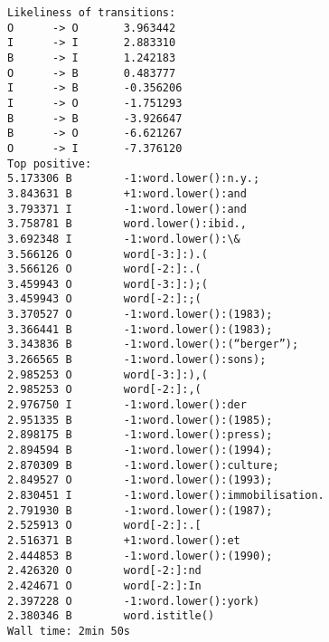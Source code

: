 \documentclass[11pt]{article}
\begin{document}
\begin{Verbatim}[commandchars=\\\{\}]
Likeliness of transitions:
O      -> O       3.963442
I      -> I       2.883310
B      -> I       1.242183
O      -> B       0.483777
I      -> B       -0.356206
I      -> O       -1.751293
B      -> B       -3.926647
B      -> O       -6.621267
O      -> I       -7.376120
Top positive:
5.173306 B        -1:word.lower():n.y.;
3.843631 B        +1:word.lower():and
3.793371 I        -1:word.lower():and
3.758781 B        word.lower():ibid.,
3.692348 I        -1:word.lower():\&
3.566126 O        word[-3:]:).(
3.566126 O        word[-2:]:.(
3.459943 O        word[-3:]:);(
3.459943 O        word[-2:]:;(
3.370527 O        -1:word.lower():(1983);
3.366441 B        -1:word.lower():(1983);
3.343836 B        -1:word.lower():(“berger”);
3.266565 B        -1:word.lower():sons);
2.985253 O        word[-3:]:),(
2.985253 O        word[-2:]:,(
2.976750 I        -1:word.lower():der
2.951335 B        -1:word.lower():(1985);
2.898175 B        -1:word.lower():press);
2.894594 B        -1:word.lower():(1994);
2.870309 B        -1:word.lower():culture;
2.849527 O        -1:word.lower():(1993);
2.830451 I        -1:word.lower():immobilisation.
2.791930 B        -1:word.lower():(1987);
2.525913 O        word[-2:]:.[
2.516371 B        +1:word.lower():et
2.444853 B        -1:word.lower():(1990);
2.426320 O        word[-2:]:nd
2.424671 O        word[-2:]:In
2.397228 O        -1:word.lower():york)
2.380346 B        word.istitle()
Wall time: 2min 50s

    \end{Verbatim}


    
    
    
    
\end{document}
